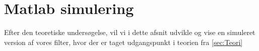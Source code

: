 \graphicspath{{Chapters/Matlab/}}


\section{Matlab simulering}

Efter den teoretiske undersøgelse, vil vi i dette afsnit udvikle og vise en simuleret version af vores filter, hvor der er taget udgangspunkt i teorien fra \ref{sec:Teori}